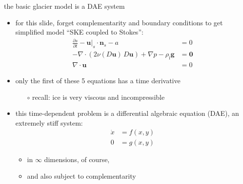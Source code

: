\documentclass[svgnames,
               hyperref={colorlinks,citecolor=DeepPink4,linkcolor=FireBrick,urlcolor=Maroon},
               usepdftitle=false]  %
               {beamer}
\newcommand{\bn}{\mathbf{n}}
\newcommand{\bu}{\mathbf{u}}
\newcommand{\bzero}{\bm{0}}
\newcommand{\rhoi}{\rho_{\text{i}}}
\begin{document}
\begin{frame}{the basic glacier model is a DAE system}

\begin{itemize}
\item for this slide, forget complementarity and boundary conditions to get simplified model ``SKE coupled to Stokes'':
\begin{align*}
\frac{\partial s}{\partial t} - \bu|_s \cdot \bn_s - a &= 0 \\
- \nabla \cdot \left(2 \nu(D\bu)\, D\bu\right) + \nabla p - \rhoi \mathbf{g} &= \bzero \\
\nabla \cdot \bu &= 0
\end{align*}

\item only the first of these 5 equations has a time derivative
    \begin{itemize}
    \item[$\circ$] recall: ice is very viscous and incompressible
    \end{itemize}
\item<2> this time-dependent problem is a \alert{differential algebraic equation} (DAE), an extremely stiff system:
\begin{align*}
\dot x &= f(x,y) \\
     0 &= g(x,y)
\end{align*}

    \begin{itemize}
    \item<2>[$\circ$] in $\infty$ dimensions, of course,
    \item<2> and also subject to complementarity
    \end{itemize}
\end{itemize}
\end{frame}
\end{document}
